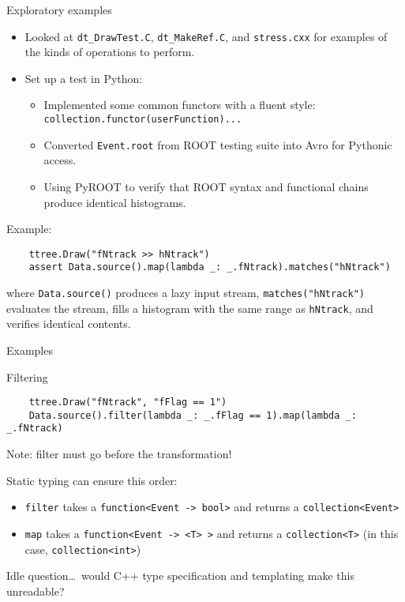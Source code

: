 \documentclass{beamer}
\begin{document}
\begin{frame}[fragile]{Exploratory examples}

\begin{itemize}
\item Looked at {\tt dt\_DrawTest.C}, {\tt dt\_MakeRef.C}, and {\tt stress.cxx} for examples of the kinds of operations to perform.
\item Set up a test in Python:
\begin{itemize}
\item Implemented some common functors with a fluent style: {\tt collection.functor(userFunction)...}
\item Converted {\tt Event.root} from ROOT testing suite into Avro for Pythonic access.
\item Using PyROOT to verify that ROOT syntax and functional chains produce identical histograms.
\end{itemize}
\end{itemize}

\begin{block}{Example:}
\vspace{-0.5\baselineskip}
{\scriptsize \begin{verbatim}
    ttree.Draw("fNtrack >> hNtrack")
    assert Data.source().map(lambda _: _.fNtrack).matches("hNtrack")
\end{verbatim}}

\vspace{-0.5\baselineskip}
where {\tt Data.source()} produces a lazy input stream, {\tt matches("hNtrack")} evaluates the stream, fills a histogram with the same range as {\tt hNtrack}, and verifies identical contents.
\end{block}
\end{frame}

\begin{frame}[fragile]{Examples}
\begin{block}{Filtering}
\vspace{-0.5\baselineskip}
{\scriptsize \begin{verbatim}
    ttree.Draw("fNtrack", "fFlag == 1")
    Data.source().filter(lambda _: _.fFlag == 1).map(lambda _: _.fNtrack)
\end{verbatim}}

Note: filter must go before the transformation!

\vspace{0.2 cm}
Static typing can ensure this order:
\begin{itemize}
\item {\tt filter} takes a {\tt function<Event -> bool>} and returns a {\tt collection<Event>}
\item {\tt map} takes a {\tt function<Event -> <T> >} and returns a {\tt collection<T>} (in this case, {\tt collection<int>})
\end{itemize}

\vspace{0.2 cm}
Idle question\ldots\ would C++ type specification and templating make this unreadable?
\end{block}
\end{frame}
\end{document}
